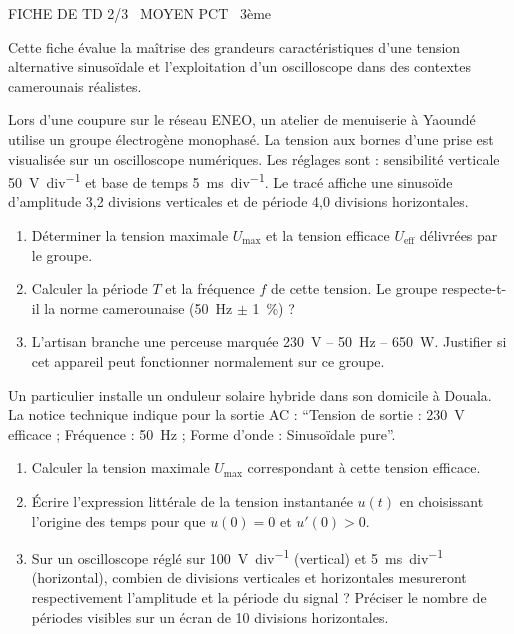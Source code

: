 \documentclass[11pt]{article}
\begin{document}
\begin{tcolorbox}[enhanced,colback=popink,colframe=popink,arc=10pt,boxrule=0pt,left=12pt,right=12pt,top=9pt,bottom=9pt]
{\color{white}\popxbold\small FICHE DE TD 2/3 \textbullet\ MOYEN \hfill PCT \textbullet\ 3ème\par}
\end{tcolorbox}
\vspace{4pt}
\noindent Cette fiche évalue la maîtrise des grandeurs caractéristiques d'une tension alternative sinusoïdale et l'exploitation d'un oscilloscope dans des contextes camerounais réalistes.

\begin{exercice}
Lors d'une coupure sur le réseau ENEO, un atelier de menuiserie à Yaoundé utilise un groupe électrogène monophasé. La tension aux bornes d'une prise est visualisée sur un oscilloscope numériques. Les réglages sont : sensibilité verticale \SI{50}{V.div^{-1}} et base de temps \SI{5}{ms.div^{-1}}. Le tracé affiche une sinusoïde d'amplitude 3,2 divisions verticales et de période 4,0 divisions horizontales.
\begin{enumerate}
    \item Déterminer la tension maximale $U_{\text{max}}$ et la tension efficace $U_{\text{eff}}$ délivrées par le groupe.
    \item Calculer la période $T$ et la fréquence $f$ de cette tension. Le groupe respecte-t-il la norme camerounaise (\SI{50}{Hz} $\pm$ \SI{1}{\%}) ?
    \item L'artisan branche une perceuse marquée \SI{230}{V} -- \SI{50}{Hz} -- \SI{650}{W}. Justifier si cet appareil peut fonctionner normalement sur ce groupe.
\end{enumerate}
\end{exercice}

\begin{exercice}
Un particulier installe un onduleur solaire hybride dans son domicile à Douala. La notice technique indique pour la sortie AC : ``Tension de sortie : \SI{230}{V} efficace ; Fréquence : \SI{50}{Hz} ; Forme d'onde : Sinusoïdale pure''.
\begin{enumerate}
    \item Calculer la tension maximale $U_{\text{max}}$ correspondant à cette tension efficace.
    \item Écrire l'expression littérale de la tension instantanée $u(t)$ en choisissant l'origine des temps pour que $u(0)=0$ et $u'(0)>0$.
    \item Sur un oscilloscope réglé sur \SI{100}{V.div^{-1}} (vertical) et \SI{5}{ms.div^{-1}} (horizontal), combien de divisions verticales et horizontales mesureront respectivement l'amplitude et la période du signal ? Préciser le nombre de périodes visibles sur un écran de 10 divisions horizontales.
\end{enumerate}
\end{exercice}
\end{document}
